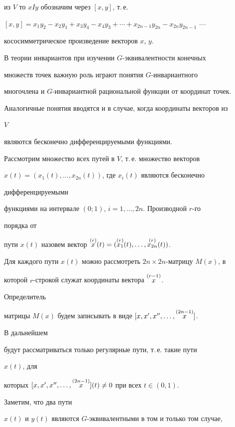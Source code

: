 из $V$ то $x I y$ обозначим через $[x,y]$, т.\,е.


$[x,y]=x_1y_2-x_2y_1+x_3y_4-x_4y_3+\dotsb+ x_{2n-1}y_{2n}- 


x_{2n}y_{2n-1}$ --- 


кососимметрическое произведение векторов $x$, $y$.





В теории инвариантов при изучении $G$-эквивалентности конечных


множеств точек важную роль играют понятия $G$-инвариантного 


многочлена и $G$-инвариантной рациональной функции от координат точек. 


Аналогичные понятия вводятся и в случае, когда координаты векторов из 


$V$


являются бесконечно дифференцируемыми функциями.





Рассмотрим множество всех путей в $V$, т.\,е. множество векторов 


$x(t)=(x_1(t),\dotsc,x_{2n}(t))$, где $x_i(t)$ являются бесконечно 


дифференцируемыми 


функциями на интервале $(0;1)$, $i=1,\dotsc,2n$. Производной $r$-го 


порядка от


пути $x(t)$ назовем вектор $\up{(r)}{x}(t)= (\up{(r)}{x_1}(t),\dotsc, 


\up{(r)}{x_{2n}}(t))$.





Для каждого пути $x(t)$ можно рассмотреть $2n\times 2n$-матрицу $M(x)$, в


которой $r$-строкой служат координаты вектора $\overset{(r-1)}{x}{}$. 


Определитель 


матрицы $M(x)$ будем записывать в виде $[x,x',x'',\dotsc,\overset{(2n-1)}{x}{}]$. 


В дальнейшем


будут рассматриваться только регулярные пути, т.\,е. такие пути 


$x(t)$, для


которых $[x,x',x'',\dotsc,\overset{(2n-1)}{x}{}](t)\ne0$ при всех $t\in(0,1)$. 


Заметим, что два пути


$x(t)$ и $y(t)$ являются $G$-эквивалентными в том и только том случае, 


